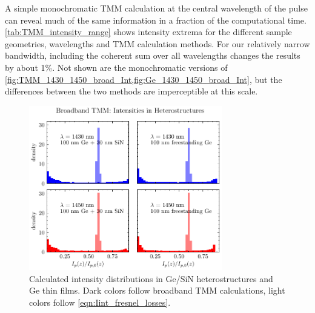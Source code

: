 
A simple monochromatic TMM calculation at the central wavelength of the pulse can reveal much of the same information in a fraction of the computational time. \cref{tab:TMM_intensity_range} shows intensity extrema for the different sample geometries, wavelengths and TMM calculation methods. For our relatively narrow bandwidth, including the coherent sum over all wavelengths changes the results by about 1\%. Not shown are the monochromatic versions of \cref{fig:TMM_1430_1450_broad_Int,fig:Ge_1430_1450_broad_Int}, but the differences between the two methods are imperceptible at this scale.

\begin{figure}
	\centering
	\includegraphics[width=0.75\textwidth]{figures/chap4/TMM_hist_chrom_int_2x2.pdf}
	\caption{Calculated intensity distributions in Ge/SiN heterostructures and Ge thin films. Dark colors follow broadband TMM calculations, light colors follow \cref{eqn:Iint_fresnel_losses}.}
	\label{fig:TMM_hist_chrom_int_2x2}
\end{figure}

